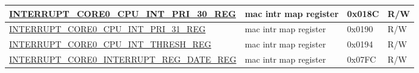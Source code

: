 \begin{longtable}{ | p{6cm} | p{7.2cm} | p{1.3cm} | p{1cm} | }
\hyperref[regdesc:INTERRUPTCORE0CPUINTPRI30REG]{INTERRUPT\_CORE0\_CPU\_INT\_PRI\_30\_REG} & mac intr map register & 0x018C & R/W \\ \hline
\hyperref[regdesc:INTERRUPTCORE0CPUINTPRI31REG]{INTERRUPT\_CORE0\_CPU\_INT\_PRI\_31\_REG} & mac intr map register & 0x0190 & R/W \\ \hline
\hyperref[regdesc:INTERRUPTCORE0CPUINTTHRESHREG]{INTERRUPT\_CORE0\_CPU\_INT\_THRESH\_REG} & mac intr map register & 0x0194 & R/W \\ \hline
\hyperref[regdesc:INTERRUPTCORE0INTERRUPTREGDATEREG]{INTERRUPT\_CORE0\_INTERRUPT\_REG\_DATE\_REG} & mac intr map register & 0x07FC & R/W \\ \hline
\end{longtable}
